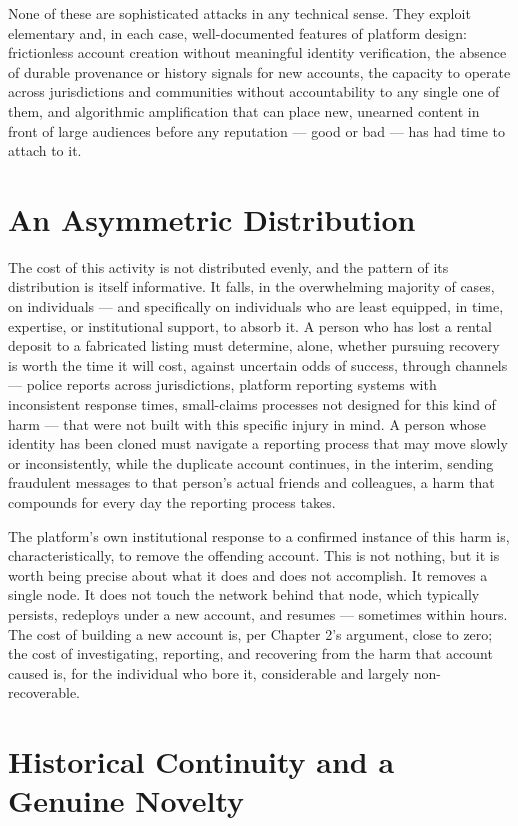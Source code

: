 \documentclass[12pt,a4paper]{book}
\begin{document}
None of these are sophisticated attacks in any technical sense. They exploit elementary and, in each case, well-documented features of platform design: frictionless account creation without meaningful identity verification, the absence of durable provenance or history signals for new accounts, the capacity to operate across jurisdictions and communities without accountability to any single one of them, and algorithmic amplification that can place new, unearned content in front of large audiences before any reputation — good or bad — has had time to attach to it.

\section{An Asymmetric Distribution}

The cost of this activity is not distributed evenly, and the pattern of its distribution is itself informative. It falls, in the overwhelming majority of cases, on individuals — and specifically on individuals who are least equipped, in time, expertise, or institutional support, to absorb it. A person who has lost a rental deposit to a fabricated listing must determine, alone, whether pursuing recovery is worth the time it will cost, against uncertain odds of success, through channels — police reports across jurisdictions, platform reporting systems with inconsistent response times, small-claims processes not designed for this kind of harm — that were not built with this specific injury in mind. A person whose identity has been cloned must navigate a reporting process that may move slowly or inconsistently, while the duplicate account continues, in the interim, sending fraudulent messages to that person's actual friends and colleagues, a harm that compounds for every day the reporting process takes.

The platform's own institutional response to a confirmed instance of this harm is, characteristically, to remove the offending account. This is not nothing, but it is worth being precise about what it does and does not accomplish. It removes a single node. It does not touch the network behind that node, which typically persists, redeploys under a new account, and resumes — sometimes within hours. The cost of building a new account is, per Chapter 2's argument, close to zero; the cost of investigating, reporting, and recovering from the harm that account caused is, for the individual who bore it, considerable and largely non-recoverable.

\section{Historical Continuity and a Genuine Novelty}
\end{document}
